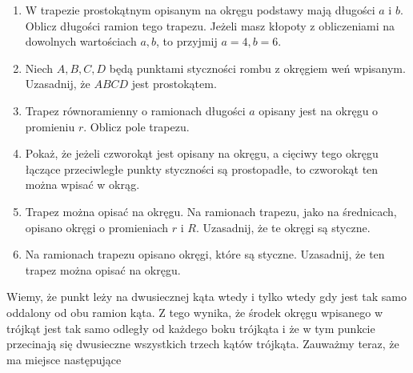 \documentclass[10pt]{article}
\begin{document}
\begin{enumerate}
  \item W trapezie prostokątnym opisanym na okręgu podstawy mają długości \(a\) i \(b\). Oblicz długości ramion tego trapezu. Jeżeli masz kłopoty z obliczeniami na dowolnych wartościach \(a, b\), to przyjmij \(a=4, b=6\).
  \item Niech \(A, B, C, D\) będą punktami styczności rombu z okręgiem weń wpisanym. Uzasadnij, że \(A B C D\) jest prostokątem.
  \item Trapez równoramienny o ramionach długości \(a\) opisany jest na okręgu o promieniu \(r\). Oblicz pole trapezu.
  \item Pokaż, że jeżeli czworokąt jest opisany na okręgu, a cięciwy tego okręgu łączące przeciwległe punkty styczności są prostopadłe, to czworokąt ten można wpisać w okrąg.
  \item Trapez można opisać na okręgu. Na ramionach trapezu, jako na średnicach, opisano okręgi o promieniach \(r\) i \(R\). Uzasadnij, że te okręgi są styczne.
  \item Na ramionach trapezu opisano okręgi, które są styczne. Uzasadnij, że ten trapez można opisać na okręgu.
\end{enumerate}

Wiemy, że punkt leży na dwusiecznej kąta wtedy i tylko wtedy gdy jest tak samo oddalony od obu ramion kąta. Z tego wynika, że środek okręgu wpisanego w trójkąt jest tak samo odległy od każdego boku trójkąta i że w tym punkcie przecinają się dwusieczne wszystkich trzech kątów trójkąta. Zauważmy teraz, że ma miejsce następujące
\end{document}
